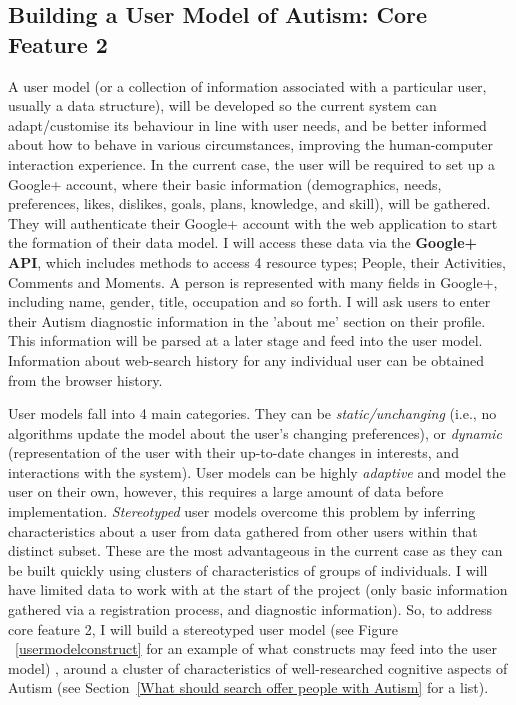 \documentclass[a4paper, 10pt]{article}
\begin{document}
\subsection {Building a User Model of Autism: Core Feature 2}\label{usermodel}
A user model (or a collection of information associated with a particular user, usually a data structure), will be developed so the current system can adapt/customise its behaviour in line with user needs, and be better informed about how to behave in various circumstances, improving the human-computer interaction experience. In the current case, the user will be required to set up a Google+ account, where their basic information (demographics, needs, preferences, likes, dislikes, goals, plans, knowledge, and skill), will be gathered. They will authenticate their Google+ account with the web application to start the formation of their data model. I will access these data via the \textbf{Google+ API}, which includes methods to access 4 resource  types; People, their Activities, Comments and Moments. A person is represented with many fields in Google+, including name, gender, title, occupation and so forth. I will ask users to enter their Autism diagnostic information in the 'about me' section on their profile. This information will be parsed at a later stage and feed into the user model. Information about web-search history for any individual user can be obtained from the browser history. 

User models fall into 4 main categories. They can be \textit{static/unchanging} (i.e., no algorithms update the model about the user's changing preferences), or \textit{dynamic} (representation of the user with their up-to-date changes in interests, and interactions with the system). User models can be highly \textit{adaptive} and model the user on their own, however, this requires a large amount of data before implementation. \textit{Stereotyped} user models overcome this problem by inferring characteristics about a user from data gathered from other users within that distinct subset. These are the most advantageous in the current case as they can be built quickly using clusters of characteristics of groups of individuals. I will have limited data to work with at the start of the project (only basic information gathered via a registration process, and diagnostic information). So, to address core feature 2, I will build a stereotyped user model (see Figure ~\ref{usermodelconstruct} for an example of what constructs may feed into the user model) , around a cluster of characteristics of well-researched cognitive aspects of Autism (see Section~\ref{What should search offer people with Autism} for a list).
\end{document}
